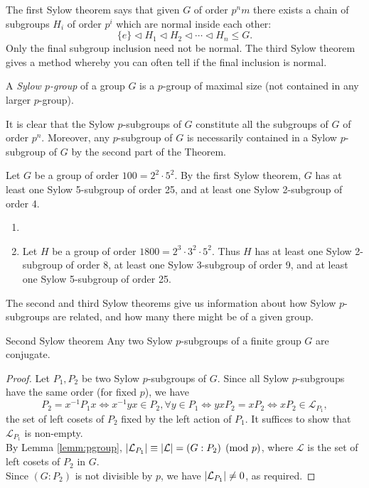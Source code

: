 The first Sylow theorem says that given $G$ of order $p^nm$ there exists a chain of subgroups $H_i$ of order $p^i$ which are normal inside each other:
\[\{e\}\triangleleft H_1\triangleleft H_2\triangleleft\cdots\triangleleft H_n\le G.\]
Only the final subgroup inclusion need not be normal. The third Sylow theorem gives a method whereby you can often tell if the final inclusion is normal.

\begin{defn}{}{}
A \emph{Sylow $p$-group} of a group $G$ is a $p$-group of maximal size (not contained in any larger $p$-group).
\end{defn}

It is clear that the Sylow $p$-subgroups of $G$ constitute all the subgroups of $G$ of order $p^n$. Moreover, any $p$-subgroup of $G$ is necessarily contained in a Sylow $p$-subgroup of $G$ by the second part of the Theorem.

\begin{examples}{}{}
\exstart Let $G$ be a group of order $100=2^2\cdot 5^2$. By the first Sylow theorem, $G$ has at least one Sylow 5-subgroup of order 25, and at least one Sylow 2-subgroup of order 4.
\begin{enumerate}
\item 
\item Let $H$ be a group of order $1800=2^3\cdot 3^2\cdot 5^2$. Thus $H$ has at least one Sylow 2-subgroup of order 8, at least one Sylow 3-subgroup of order 9, and at least one Sylow 5-subgroup of order 25.
\end{enumerate}
\end{examples}

The second and third Sylow theorems give us information about how Sylow $p$-subgroups are related, and how many there might be of a given group.

\begin{thm}{Second Sylow theorem}{}
Any two Sylow $p$-subgroups of a finite group $G$ are conjugate.
\end{thm}

\begin{proof}
Let $P_1,P_2$ be two Sylow $p$-subgroups of $G$. Since all Sylow $p$-subgroups have the same order (for fixed $p$), we have
\[P_2=x^{-1}P_1x\iff x^{-1}yx\in P_2, \forall y\in P_1\iff yxP_2=xP_2\iff xP_2\in\mathcal L_{P_1},\]
the set of left cosets of $P_2$ fixed by the left action of $P_1$. It suffices to show that $\mathcal L_{P_1}$ is non-empty.\\
By Lemma \ref{lemm:pgroup}, $\left| \mathcal L_{P_1}\right|\equiv\left| \mathcal L\right|=(G:P_2)\pmod p$, where $\mathcal L$ is the set of left cosets of $P_2$ in $G$.\\
Since $(G:P_2)$ is not divisible by $p$, we have $\left| \mathcal L_{P_1}\right|\neq 0$, as required.
\end{proof}

